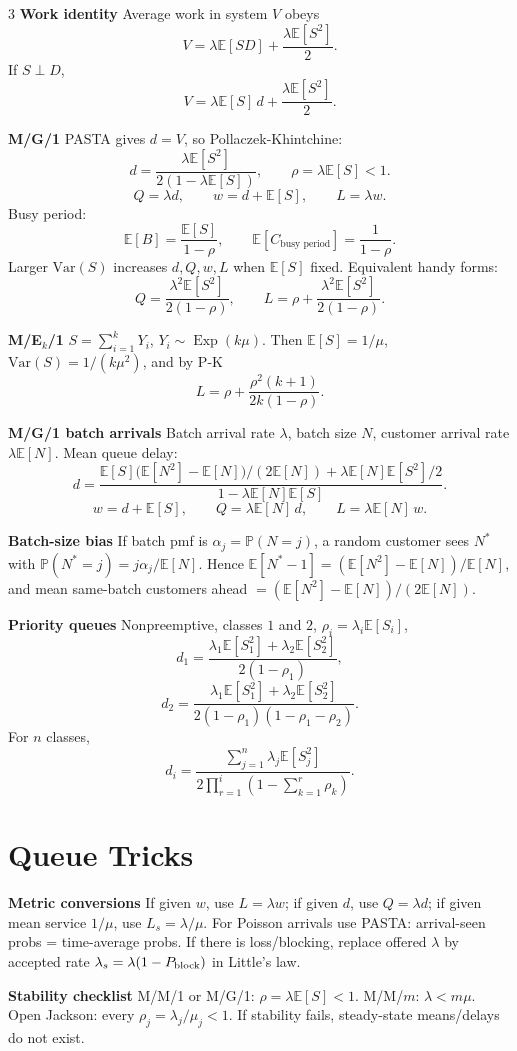 \documentclass[a4paper,8pt,fleqn]{extarticle}
\newcommand{\E}{\mathbb{E}}
\newcommand{\PP}{\mathbb{P}}
\newcommand{\Var}{\mathrm{Var}}
\newcommand{\1}{\mathbf{1}}
\newcommand{\sub}[1]{\textbf{#1} }
\DeclareMathOperator{\Exp}{Exp}
\begin{document}
\begin{multicols}{3}
\sub{Work identity} Average work in system \(V\) obeys
\[
V=\lambda \E[S D]+\frac{\lambda \E[S^2]}{2}.
\]
If \(S\perp D\),
\[
V=\lambda \E[S]\,d+\frac{\lambda \E[S^2]}{2}.
\]

\sub{M/G/1} PASTA gives \(d=V\), so Pollaczek-Khintchine:
\[
d=\frac{\lambda \E[S^2]}{2(1-\lambda\E[S])},\qquad \rho=\lambda\E[S]<1.
\]
\[
Q=\lambda d,\qquad w=d+\E[S],\qquad L=\lambda w.
\]
Busy period:
\[
\E[B]=\frac{\E[S]}{1-\rho},\qquad
\E[C_{\text{busy period}}]=\frac{1}{1-\rho}.
\]
Larger \(\Var(S)\) increases \(d,Q,w,L\) when \(\E[S]\) fixed.
Equivalent handy forms:
\[
Q=\frac{\lambda^2\E[S^2]}{2(1-\rho)},\qquad
L=\rho+\frac{\lambda^2\E[S^2]}{2(1-\rho)}.
\]

\sub{M/E\(_k\)/1} \(S=\sum_{i=1}^k Y_i\), \(Y_i\sim \Exp(k\mu)\). Then \(\E[S]=1/\mu\), \(\Var(S)=1/(k\mu^2)\), and by P-K
\[
L=\rho+\frac{\rho^2(k+1)}{2k(1-\rho)}.
\]

\sub{M/G/1 batch arrivals} Batch arrival rate \(\lambda\), batch size \(N\), customer arrival rate \(\lambda\E[N]\). Mean queue delay:
\[
d=
\frac{\E[S]\big(\E[N^2]-\E[N]\big)/(2\E[N])+\lambda \E[N]\E[S^2]/2}
{1-\lambda \E[N]\E[S]}.
\]
\[
w=d+\E[S],\qquad Q=\lambda \E[N]\,d,\qquad L=\lambda \E[N]\,w.
\]

\sub{Batch-size bias} If batch pmf is \(\alpha_j=\PP(N=j)\), a random customer sees \(N^*\) with \(\PP(N^*=j)=j\alpha_j/\E[N]\). Hence \(\E[N^*-1]=(\E[N^2]-\E[N])/\E[N]\), and mean same-batch customers ahead \(=(\E[N^2]-\E[N])/(2\E[N])\).

\sub{Priority queues} Nonpreemptive, classes \(1\) and \(2\), \(\rho_i=\lambda_i\E[S_i]\),
\[
d_1=\frac{\lambda_1\E[S_1^2]+\lambda_2\E[S_2^2]}{2(1-\rho_1)},
\]
\[
d_2=\frac{\lambda_1\E[S_1^2]+\lambda_2\E[S_2^2]}{2(1-\rho_1)(1-\rho_1-\rho_2)}.
\]
For \(n\) classes,
\[
d_i=\frac{\sum_{j=1}^n \lambda_j \E[S_j^2]}
{2\prod_{r=1}^{i}\left(1-\sum_{k=1}^{r}\rho_k\right)}.
\]

\section*{Queue Tricks}
\sub{Metric conversions}
If given \(w\), use \(L=\lambda w\); if given \(d\), use \(Q=\lambda d\); if given mean service \(1/\mu\), use \(L_s=\lambda/\mu\). For Poisson arrivals use PASTA: arrival-seen probs = time-average probs. If there is loss/blocking, replace offered \(\lambda\) by accepted rate \(\lambda_s=\lambda(1-P_{\rm block})\) in Little's law.

\sub{Stability checklist}
M/M/1 or M/G/1: \(\rho=\lambda\E[S]<1\). M/M/\(m\): \(\lambda<m\mu\). Open Jackson: every \(\rho_j=\lambda_j/\mu_j<1\). If stability fails, steady-state means/delays do not exist.


\end{multicols}
\end{document}
